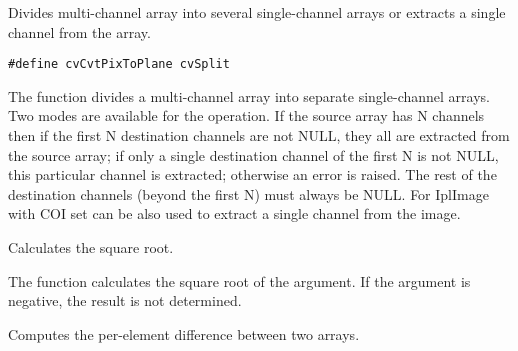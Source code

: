 Divides multi-channel array into several single-channel arrays or extracts a single channel from the array.


\begin{lstlisting}
#define cvCvtPixToPlane cvSplit
\end{lstlisting}

\begin{description}
\end{description}

The function divides a multi-channel array into separate
single-channel arrays. Two modes are available for the operation. If the
source array has N channels then if the first N destination channels
are not NULL, they all are extracted from the source array;
if only a single destination channel of the first N is not NULL, this
particular channel is extracted; otherwise an error is raised. The rest
of the destination channels (beyond the first N) must always be NULL. For
IplImage  with COI set can be also used to extract a single
channel from the image.


Calculates the square root.


\begin{description}
\end{description}


The function calculates the square root of the argument. If the argument is negative, the result is not determined.

Computes the per-element difference between two arrays.


\begin{description}
\end{description}


